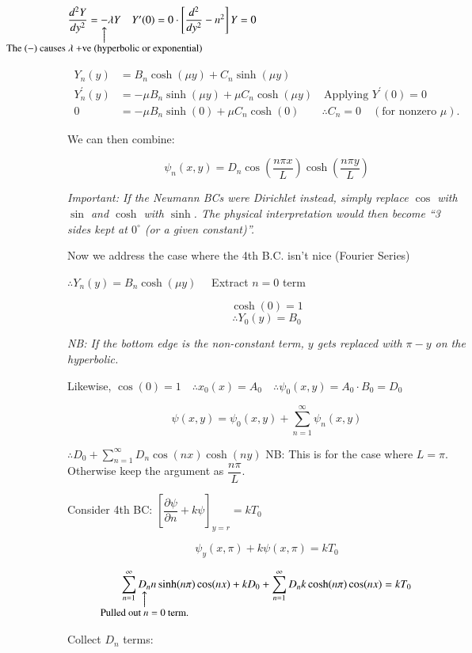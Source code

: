 \documentclass{report}
\makeatletter
\newcommand\parrow[3][3ex]{%
 \begin{array}[t]{@{}c@{}} #2 \\
  \left\uparrow\vcenter{\hrule height #1}\right.\kern-\nulldelimiterspace\\
  \makebox[0pt]{\small#3}
  \end{array}%
}
\makeatother
\begin{document}
$\dfrac{d^{2} Y}{d y^{2}}  =\parrow{-}{The $(-)$ causes $\lambda$ +ve (hyperbolic or exponential)}\lambda Y \quad Y^{\prime}(0)=0 \cdot\left[\dfrac{d^{2}}{d y^{2}}-n^{2}\right] Y=0$

$$
\begin{aligned}
Y_{n}(y) & =B_{n} \cosh (\mu y)+C_{n} \sinh (\mu y) \\
Y_{n}^{\prime}(y) & =-\mu B_{n} \sinh (\mu y)+\mu C_{n} \cosh (\mu y) \quad \text{Applying } Y^{\prime}(0)=0 \\
0 & =-\mu B_{n} \sinh (0)+\mu C_{n} \cosh (0) \qquad \therefore C_{n}=0 \quad(\text {for nonzero } \mu).
\end{aligned}
$$

We can then combine:

\[
\boxed{
\psi_{n}(x, y)=D_{n} \cos \left(\dfrac{n \pi x}{L}\right) \cosh \left(\dfrac{n \pi y}{L}\right)
}
\]

\textit{Important: If the Neumann BCs were Dirichlet instead, simply replace $\cos$ with $\sin$ and $\cosh$ with $\sinh$. The physical interpretation would then become ``3 sides kept at $0^{\circ}$ (or a given constant)''.}

Now we address the case where the 4th B.C. isn't nice (Fourier Series) 

$\therefore Y_{n}(y)=B_{n} \cosh (\mu y) \quad$ Extract $n=0$ term

$$\cosh (0)=1$$
$$
\therefore Y_{0}(y)=B_{0}
$$


\textit{NB: If the bottom edge is the non-constant term, $y$ gets replaced with $\pi-y$ on the hyperbolic.}

Likewise, $\cos (0)=1 \quad \therefore x_{0}(x)=A_{0} \quad \therefore \psi_{0}(x, y)=A_{0} \cdot B_{0}=D_{0}$

$$
\psi(x, y)=\psi_{0}(x, y)+\sum\limits_{n=1}^{\infty} \psi_{n}(x, y)
$$

$\therefore D_{0}+\sum\limits_{n=1}^{\infty} D_{n} \cos (n x) \cosh (n y)$ NB: This is for the case where $L=\pi$. Otherwise keep the argument as $\dfrac{n\pi}{L}$.

Consider 4th BC: $\left[\dfrac{\partial \psi}{\partial n}+k \psi\right]_{y=r}=k T_{0}$

$$\psi_{y}(x, \pi)+k \psi(x, \pi)=k T_{0}$$

$$\sum\limits_{n=1}^{\infty} \parrow{D_{n}}{Pulled out $n=0$ term.} n \sinh (n \pi) \cos (n x)+k {D_{0}}+\sum\limits_{n=1}^{\infty} D_{n} k \cosh (n \pi) \cos (n x)=k T_{0}$$


Collect $D_{n}$ terms:
\end{document}
